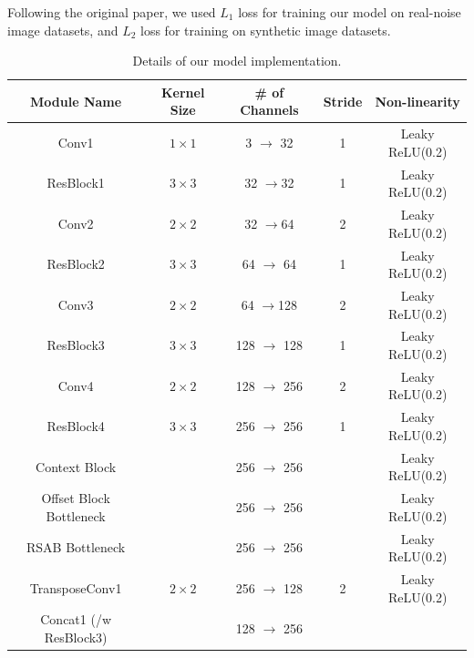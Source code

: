 Following the original paper, we used $L_{1}$ loss for training our model on real-noise image datasets, and $L_{2}$ loss for training on synthetic image datasets.

\begin{table}[t!]
\centering
\caption{Details of our model implementation.}
\label{tab:long}
\begin{tabular}{c|c|c|c|c}
\textbf{Module Name}    & \textbf{Kernel Size} & \textbf{\# of Channels} & \textbf{Stride} & \textbf{Non-linearity} \\ \hline
Conv1                   & $1\times1$           & 3 $\rightarrow$ 32      & 1               & Leaky ReLU(0.2)        \\
ResBlock1               & $3\times3$           & 32 $\rightarrow$32      & 1               & Leaky ReLU(0.2)        \\
Conv2                   & $2\times2$           & 32 $\rightarrow$64      & 2               & Leaky ReLU(0.2)        \\
ResBlock2               & $3\times3$           & 64 $\rightarrow$ 64     & 1               & Leaky ReLU(0.2)        \\
Conv3                   & $2\times2$           & 64 $\rightarrow$128     & 2               & Leaky ReLU(0.2)        \\
ResBlock3               & $3\times3$           & 128 $\rightarrow$ 128   & 1               & Leaky ReLU(0.2)        \\
Conv4                   & $2\times2$           & 128 $\rightarrow$ 256   & 2               & Leaky ReLU(0.2)        \\
ResBlock4               & $3\times3$           & 256 $\rightarrow$ 256   & 1               & Leaky ReLU(0.2)        \\ \hline
Context Block           &                      & 256 $\rightarrow$ 256   &                 & Leaky ReLU(0.2)        \\
Offset Block Bottleneck &                      & 256 $\rightarrow$ 256   &                 & Leaky ReLU(0.2)        \\
RSAB Bottleneck         &                      & 256 $\rightarrow$ 256   &                 & Leaky ReLU(0.2)        \\ \hline
TransposeConv1          & $2\times2$           & 256 $\rightarrow$ 128   & 2               & Leaky ReLU(0.2)        \\
Concat1 (/w ResBlock3)  &                      & 128 $\rightarrow$ 256   &                 &                        \\

\end{tabular}
\end{table}
